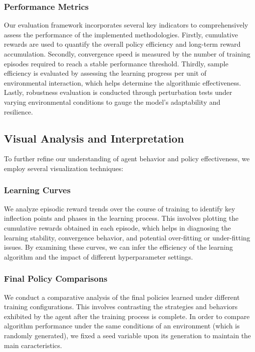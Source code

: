 \documentclass[../CSC_52081_EP.tex]{subfiles}
\begin{document}
\subsubsection{Performance Metrics}
Our evaluation framework incorporates several key indicators to comprehensively assess the performance of the implemented methodologies. Firstly, cumulative rewards are used to quantify the overall policy efficiency and long-term reward accumulation. Secondly, convergence speed is measured by the number of training episodes required to reach a stable performance threshold. Thirdly, sample efficiency is evaluated by assessing the learning progress per unit of environmental interaction, which helps determine the algorithmic effectiveness. Lastly, robustness evaluation is conducted through perturbation tests under varying environmental conditions to gauge the model's adaptability and resilience.


\subsection{Visual Analysis and Interpretation}
To further refine our understanding of agent behavior and policy effectiveness, we employ several visualization techniques:

\subsubsection{Learning Curves}
We analyze episodic reward trends over the course of training to identify key inflection points and phases in the learning process. This involves plotting the cumulative rewards obtained in each episode, which helps in diagnosing the learning stability, convergence behavior, and potential over-fitting or under-fitting issues. By examining these curves, we can infer the efficiency of the learning algorithm and the impact of different hyperparameter settings.


\subsubsection{Final Policy Comparisons}
We conduct a comparative analysis of the final policies learned under different training configurations. This involves contrasting the strategies and behaviors exhibited by the agent after the training process is complete. In order to compare algorithm performance under the same conditions of an environment (which is randomly generated), we fixed a seed variable upon its generation to maintain the main caracteristics.
\end{document}
